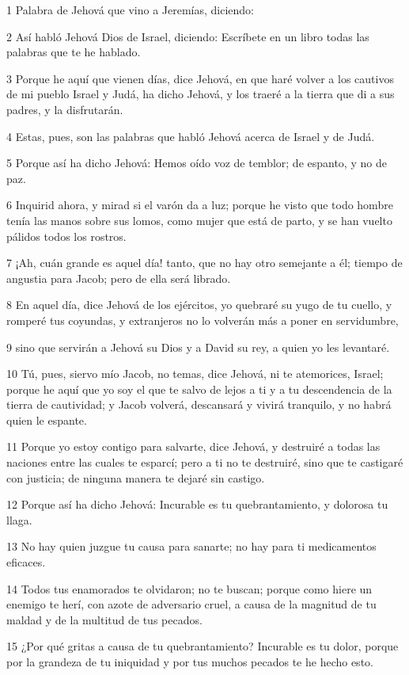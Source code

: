 \par 1 Palabra de Jehová que vino a Jeremías, diciendo:
\par 2 Así habló Jehová Dios de Israel, diciendo: Escríbete en un libro todas las palabras que te he hablado.
\par 3 Porque he aquí que vienen días, dice Jehová, en que haré volver a los cautivos de mi pueblo Israel y Judá, ha dicho Jehová, y los traeré a la tierra que di a sus padres, y la disfrutarán.
\par 4 Estas, pues, son las palabras que habló Jehová acerca de Israel y de Judá.
\par 5 Porque así ha dicho Jehová: Hemos oído voz de temblor; de espanto, y no de paz.
\par 6 Inquirid ahora, y mirad si el varón da a luz; porque he visto que todo hombre tenía las manos sobre sus lomos, como mujer que está de parto, y se han vuelto pálidos todos los rostros.
\par 7 ¡Ah, cuán grande es aquel día! tanto, que no hay otro semejante a él; tiempo de angustia para Jacob; pero de ella será librado.
\par 8 En aquel día, dice Jehová de los ejércitos, yo quebraré su yugo de tu cuello, y romperé tus coyundas, y extranjeros no lo volverán más a poner en servidumbre,
\par 9 sino que servirán a Jehová su Dios y a David su rey, a quien yo les levantaré.
\par 10 Tú, pues, siervo mío Jacob, no temas, dice Jehová, ni te atemorices, Israel; porque he aquí que yo soy el que te salvo de lejos a ti y a tu descendencia de la tierra de cautividad; y Jacob volverá, descansará y vivirá tranquilo, y no habrá quien le espante.
\par 11 Porque yo estoy contigo para salvarte, dice Jehová, y destruiré a todas las naciones entre las cuales te esparcí; pero a ti no te destruiré, sino que te castigaré con justicia; de ninguna manera te dejaré sin castigo. 
\par 12 Porque así ha dicho Jehová: Incurable es tu quebrantamiento, y dolorosa tu llaga.
\par 13 No hay quien juzgue tu causa para sanarte; no hay para ti medicamentos eficaces.
\par 14 Todos tus enamorados te olvidaron; no te buscan; porque como hiere un enemigo te herí, con azote de adversario cruel, a causa de la magnitud de tu maldad y de la multitud de tus pecados.
\par 15 ¿Por qué gritas a causa de tu quebrantamiento? Incurable es tu dolor, porque por la grandeza de tu iniquidad y por tus muchos pecados te he hecho esto.
